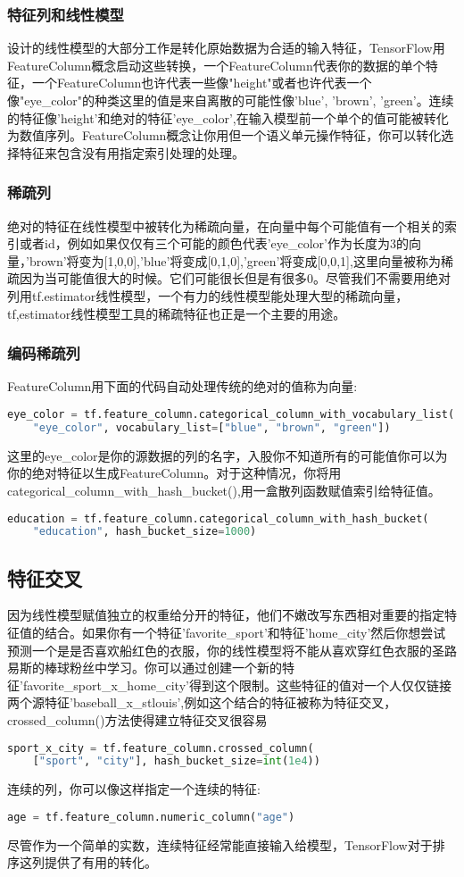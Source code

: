 \subsubsection{特征列和线性模型}
设计的线性模型的大部分工作是转化原始数据为合适的输入特征，TensorFlow用FeatureColumn概念启动这些转换，一个FeatureColumn代表你的数据的单个特征，一个FeatureColumn也许代表一些像"height"或者也许代表一个像"eye\_color"的种类这里的值是来自离散的可能性像{'blue', 'brown', 'green'}。连续的特征像'height'和绝对的特征'eye\_color',在输入模型前一个单个的值可能被转化为数值序列。FeatureColumn概念让你用但一个语义单元操作特征，你可以转化选择特征来包含没有用指定索引处理的处理。
\subsubsection{稀疏列}
绝对的特征在线性模型中被转化为稀疏向量，在向量中每个可能值有一个相关的索引或者id，例如如果仅仅有三个可能的颜色代表'eye\_color'作为长度为3的向量，'brown'将变为[1,0,0],'blue'将变成[0,1,0],'green'将变成[0,0,1],这里向量被称为稀疏因为当可能值很大的时候。它们可能很长但是有很多0。尽管我们不需要用绝对列用tf.estimator线性模型，一个有力的线性模型能处理大型的稀疏向量，tf,estimator线性模型工具的稀疏特征也正是一个主要的用途。
\subsubsection{编码稀疏列}
FeatureColumn用下面的代码自动处理传统的绝对的值称为向量:
\begin{lstlisting}[language=Python]
eye_color = tf.feature_column.categorical_column_with_vocabulary_list(
    "eye_color", vocabulary_list=["blue", "brown", "green"])
\end{lstlisting}
这里的eye\_color是你的源数据的列的名字，入股你不知道所有的可能值你可以为你的绝对特征以生成FeatureColumn。对于这种情况，你将用categorical\_column\_with\_hash\_bucket(),用一盒散列函数赋值索引给特征值。
\begin{lstlisting}[language=Python]
education = tf.feature_column.categorical_column_with_hash_bucket(
    "education", hash_bucket_size=1000)
\end{lstlisting}
\subsection{特征交叉}
因为线性模型赋值独立的权重给分开的特征，他们不嫩改写东西相对重要的指定特征值的结合。如果你有一个特征'favorite\_sport'和特征'home\_city'然后你想尝试预测一个是是否喜欢船红色的衣服，你的线性模型将不能从喜欢穿红色衣服的圣路易斯的棒球粉丝中学习。你可以通过创建一个新的特征'favorite\_sport\_x\_home\_city'得到这个限制。这些特征的值对一个人仅仅链接两个源特征'baseball\_x\_stlouis',例如这个结合的特征被称为特征交叉，crossed\_column()方法使得建立特征交叉很容易
\begin{lstlisting}[language=Python]
sport_x_city = tf.feature_column.crossed_column(
    ["sport", "city"], hash_bucket_size=int(1e4))
\end{lstlisting}
连续的列，你可以像这样指定一个连续的特征:
\begin{lstlisting}[language=Python]
age = tf.feature_column.numeric_column("age")
\end{lstlisting}
尽管作为一个简单的实数，连续特征经常能直接输入给模型，TensorFlow对于排序这列提供了有用的转化。
